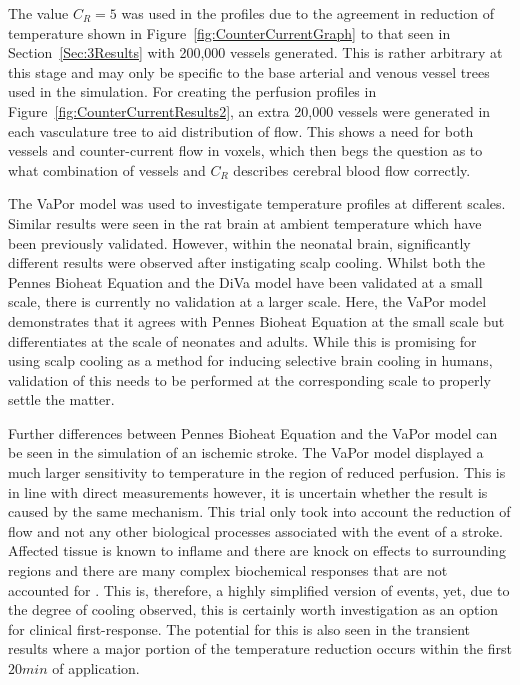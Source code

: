\documentclass[11pt,english,a4paper,twoside,openright]{report}
\begin{document}
{{{{{{{The value $C_{R}=5$ was used in the profiles due to the agreement in reduction of temperature shown in Figure~\ref{fig:CounterCurrentGraph} to that seen in Section~\ref{Sec:3Results} with 200,000 vessels generated. This is rather arbitrary at this stage and may only be specific to the base arterial and venous vessel trees used in the simulation. For creating the perfusion profiles in Figure~\ref{fig:CounterCurrentResults2}, an extra 20,000 vessels were generated in each vasculature tree to aid distribution of flow. This shows a need for both vessels and counter-current flow in voxels, which then begs the question as to what combination of vessels and $C_{R}$ describes cerebral blood flow correctly. 

The VaPor model was used to investigate temperature profiles at different scales. Similar results were seen in the rat brain at ambient temperature which have been previously validated. However, within the neonatal brain, significantly different results were observed after instigating scalp cooling. Whilst both the Pennes Bioheat Equation and the DiVa model have been validated at a small scale, there is currently no validation at a larger scale. Here, the VaPor model demonstrates that it agrees with Pennes Bioheat Equation at the small scale but differentiates at the scale of neonates and adults. While this is promising for using scalp cooling as a method for inducing selective brain cooling in humans, validation of this needs to be performed at the corresponding scale to properly settle the matter.

Further differences between Pennes Bioheat Equation and the VaPor model can be seen in the simulation of an ischemic stroke. The VaPor model displayed a much larger sensitivity to temperature in the region of reduced perfusion. This is in line with direct measurements however, it is uncertain whether the result is caused by the same mechanism. This trial only took into account the reduction of flow and not any other biological processes associated with the event of a stroke. Affected tissue is known to inflame and there are knock on effects to surrounding regions and there are many complex biochemical responses that are not accounted for \cite{deb2010pathophysiologic}. This is, therefore, a highly simplified version of events, yet, due to the degree of cooling observed, this is certainly worth investigation as an option for clinical first-response. The potential for this is also seen in the transient results where a major portion of the temperature reduction occurs within the first $20min$ of application. 

}}}}}}}
\end{document}
